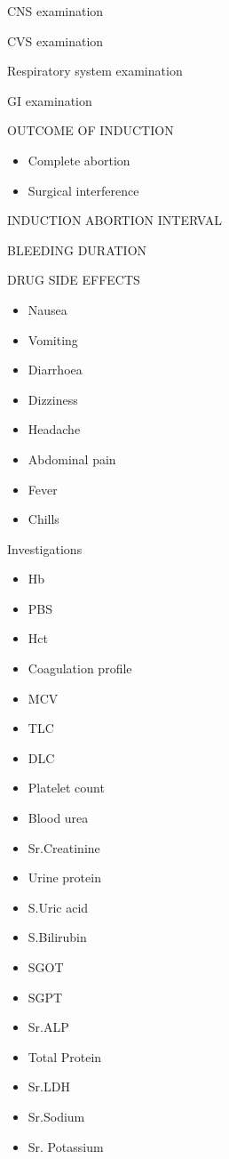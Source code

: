 \documentclass[14pt]{extarticle}
\begin{document}
CNS examination

CVS examination

Respiratory system examination

GI examination

OUTCOME OF INDUCTION

\begin{itemize}
\item Complete abortion
\item Surgical interference
\end{itemize}

INDUCTION ABORTION INTERVAL

BLEEDING DURATION

DRUG SIDE EFFECTS

\begin{itemize}
\item Nausea
\item Vomiting
\item Diarrhoea
\item Dizziness
\item Headache
\item Abdominal pain
\item Fever
\item Chills
\end{itemize}

Investigations

\begin{itemize}
\item Hb
\item PBS
\item Hct
\item Coagulation profile
\item MCV
\item TLC
\item DLC
\item Platelet count
\item Blood urea
\item Sr.Creatinine
\item Urine protein
\item S.Uric acid
\item S.Bilirubin
\item SGOT
\item SGPT
\item Sr.ALP
\item Total Protein
\item Sr.LDH
\item Sr.Sodium
\item Sr. Potassium
\end{itemize}
\end{document}
